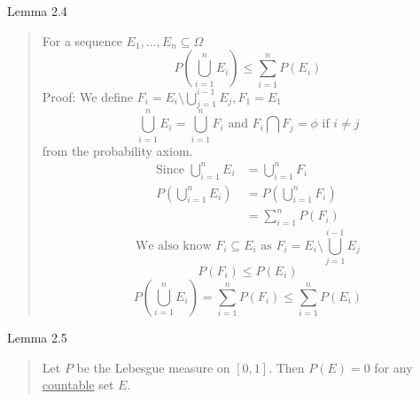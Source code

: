 Lemma 2.4
\begin{quote}
    For a sequence $E_1, \dots, E_n \subseteq \Omega$
    \[P(\bigcup_{i=1}^n E_i) \leq \sum_{i=1}^{n}P(E_i)\]
    Proof: We define $F_i = E_i \setminus \bigcup_{j=1}^{i-1}E_j, F_1 = E_1$
    \[\bigcup_{i=1}^{n} E_i = \bigcup_{i=1}^{n}F_i \text{ and } F_i \bigcap F_j = \phi \text{ if } i \neq j\]
    from the probability axiom.
    \begin{align*}
        \text{Since } \bigcup_{i=1}^{n} E_i &= \bigcup_{i=1}^{n}F_i\\
        P(\bigcup_{i=1}^{n} E_i) &= P(\bigcup_{i=1}^{n}F_i)\\
        &= \sum_{i=1}^{n}P(F_i)
    \end{align*}
    \[\text{We also know } F_i \subseteq E_i \text{ as } F_i = E_i \setminus \bigcup_{j=1}^{i-1}E_j\]
    \[P(F_i) \leq P(E_i)\]
    \[P(\bigcup_{i=1}^{n}E_i) = \sum_{i=1}^{n}P(F_i) \leq \sum_{i=1}^{n}P(E_i)\]
\end{quote}

Lemma 2.5
\begin{quote}
    Let $P$ be the Lebesgue measure on $[0,1]$. Then $P(E) = 0$ for any \underline{countable} set $E$.
\end{quote}